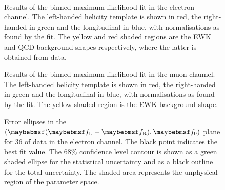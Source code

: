 \begin{figure}
\centering
{}\quad
{}\\
\caption[Results of the binned maximum likelihood fit - electrons]{Results of
  the binned maximum likelihood fit in the electron channel. The left-handed
  helicity template is shown in red, the right-handed in green and the
  longitudinal in blue, with normalisations as found by the fit. The yellow and
  red shaded regions are the \ac{EWK} and \ac{QCD} background shapes
  respectively, where the latter is obtained from data.}
\label{fig:wpol_fit_results_ele}
\end{figure}

\begin{figure}
\centering
{}\quad
{}
\caption[Results of the binned maximum likelihood fit - muons]{Results of the
  binned maximum likelihood fit in the muon channel. The left-handed helicity
  template is shown in red, the right-handed in green and the longitudinal in
  blue, with normalisations as found by the fit. The yellow shaded region is
  the \ac{EWK} background shape.}
\label{fig:wpol_fit_results_mu}
\end{figure}





\begin{figure}
\centering
{}\quad
{}
\caption[Error ellipses in the $(\fLmfR, \f0)$ plane for the electron
channel]{Error ellipses in the $(\fLmfR, \f0)$ plane for \unit{36}{\invpb} of
  data in the electron channel. The black point indicates the best fit
  value. The 68\% confidence level contour is shown as a green shaded ellipse
  for the statistical uncertainty and as a black outline for the total
  uncertainty. The shaded area represents the unphysical region of the parameter
  space.}
\label{fig:wpol_contour_ele}
\end{figure}

